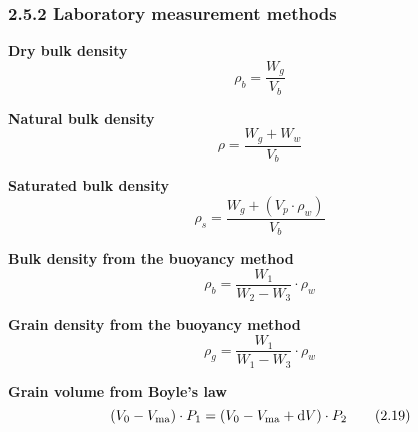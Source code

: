 \subsubsection{2.5.2 Laboratory measurement methods}
\textbf{Dry bulk density}
\begin{equation*}
    \rho_b = \frac{W_g}{V_b}\tag{2.14}
\end{equation*}

\textbf{Natural bulk density}
\begin{equation*}
    \rho = \frac{W_g + W_w}{V_b}\tag{2.15}
\end{equation*}

\textbf{Saturated bulk density}
\begin{equation*}
    \rho_s = \frac{W_g + \left(V_p\cdot\rho_w\right)}{V_b}\tag{2.16}
\end{equation*}

\textbf{Bulk density from the buoyancy method}
\begin{equation*}
    \rho_b = \frac{W_1}{W_2 - W_3}\cdot\rho_w\tag{2.17}
\end{equation*}

\textbf{Grain density from the buoyancy method}
\begin{equation*}
    \rho_g = \frac{W_1}{W_1 - W_3}\cdot\rho_w\tag{2.18}
\end{equation*}

\textbf{Grain volume from Boyle's law}
\begin{equation*}
    \left(V_0 - V_\mathrm{ma}\right)\cdot P_1 = \left(V_0 - V_\mathrm{ma} + \mathop{}\!\mathrm{d} V\right)\cdot P_2\tag{2.19}
\end{equation*}

